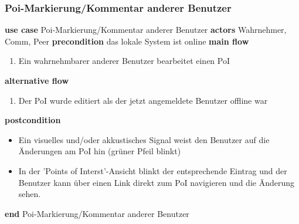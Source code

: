 \subsubsection{Poi-Markierung/Kommentar anderer Benutzer}\label{subsubsec:uc_watchpoinewornotebypeer}
\noindent \textbf{use case} Poi-Markierung/Kommentar anderer Benutzer \newline
\indent \textbf{actors} \newline
\indent \indent Wahrnehmer, Comm, Peer \newline
\indent \textbf{precondition} \newline
\indent \indent das lokale System ist online \newline
\indent \textbf{main flow}
\begin{enumerate}[labelwidth=0pt,leftmargin=39pt,noitemsep,topsep=0pt,parsep=0pt,partopsep=0pt]
\item Ein wahrnehmbarer anderer Benutzer bearbeitet einen PoI
\end{enumerate}
\indent \indent \textbf{alternative flow}
\begin{enumerate}[labelwidth=0pt,leftmargin=39pt,noitemsep,topsep=0pt,parsep=0pt,partopsep=0pt]
\item Der PoI wurde editiert als der jetzt angemeldete Benutzer offline war
\end{enumerate}
\indent \indent \textbf{postcondition}
\begin{itemize}[label={},labelwidth=0pt,leftmargin=24pt,noitemsep,topsep=0pt,parsep=0pt,partopsep=0pt]
\item Ein visuelles und/oder akkustisches Signal weist den Benutzer auf die Änderungen am PoI hin (grüner Pfeil blinkt)
\item In der 'Points of Interst'-Ansicht blinkt der entsprechende Eintrag und der Benutzer kann über einen Link direkt zum PoI navigieren und die Änderung sehen.
\end{itemize}
\noindent \textbf{end} Poi-Markierung/Kommentar anderer Benutzer

